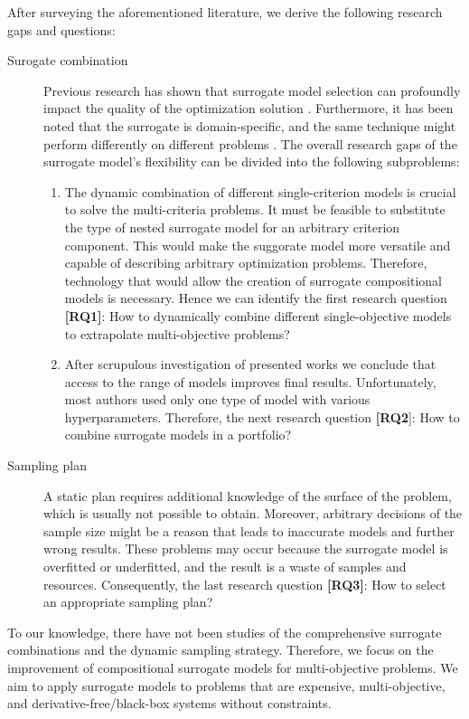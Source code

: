         After surveying the aforementioned literature, we derive the following research gaps and questions:
        \begin{description}
            \item[Surogate combination] Previous research has shown that surrogate model selection can profoundly impact the quality of the optimization solution \cite{HybridSurrRCG}. Furthermore, it has been noted that the surrogate is domain-specific, and the same technique might perform differently on different problems \cite{LuST19}. The overall research gaps of the surrogate model's flexibility can be divided into the following subproblems:
            \begin{enumerate}
                \item The dynamic combination of different single-criterion models is crucial to solve the multi-criteria problems. It must be feasible to substitute the type of nested surrogate model for an arbitrary criterion component. This would make the suggorate model more versatile and capable of describing arbitrary optimization problems. Therefore, technology that would allow the creation of surrogate compositional models is necessary. Hence we can identify the first research question \textbf{[RQ1]}: How to dynamically combine different single-objective models to extrapolate multi-objective problems?
                \item After scrupulous investigation of presented works we conclude that access to the range of models improves final results. Unfortunately, most authors used only one type of model with various hyperparameters. Therefore, the next research question \textbf{[RQ2}]: How to combine surrogate models in a portfolio?
            \end{enumerate}
            \item[Sampling plan] A static plan requires additional knowledge of the surface of the problem, which is usually not possible to obtain. Moreover, arbitrary decisions of the sample size might be a reason that leads to inaccurate models and further wrong results. These problems may occur because the surrogate model is overfitted or underfitted, and the result is a waste of samples and resources. Consequently, the last research question \textbf{[RQ3]}: How to select an appropriate sampling plan?
        \end{description}

        To our knowledge, there have not been studies of the comprehensive surrogate combinations and the dynamic sampling strategy.   Therefore, we focus on the improvement of compositional surrogate models for multi-objective problems. We aim to apply surrogate models to problems that are expensive, multi-objective, and derivative-free/black-box systems without constraints.
